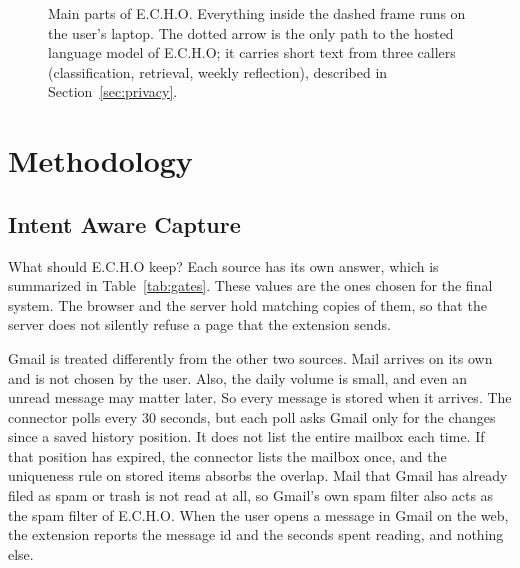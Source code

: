 \documentclass[conference]{IEEEtran}
\begin{document}
\begin{figure}[t]
\caption{Main parts of E.C.H.O. Everything inside the dashed frame runs on the user's laptop. The dotted arrow is the only path to the hosted language model of E.C.H.O; it carries short text from three callers (classification, retrieval, weekly reflection), described in Section~\ref{sec:privacy}.}
\label{fig:arch}
\end{figure}

\section{Methodology}\label{sec:method}
\subsection{Intent Aware Capture}
What should E.C.H.O keep? Each source has its own answer, which is summarized in Table~\ref{tab:gates}. These values are the ones chosen for the final system. The browser and the server hold matching copies of them, so that the server does not silently refuse a page that the extension sends.

Gmail is treated differently from the other two sources. Mail arrives on its own and is not chosen by the user. Also, the daily volume is small, and even an unread message may matter later. So every message is stored when it arrives. The connector polls every 30 seconds, but each poll asks Gmail only for the changes since a saved history position. It does not list the entire mailbox each time. If that position has expired, the connector lists the mailbox once, and the uniqueness rule on stored items absorbs the overlap. Mail that Gmail has already filed as spam or trash is not read at all, so Gmail's own spam filter also acts as the spam filter of E.C.H.O. When the user opens a message in Gmail on the web, the extension reports the message id and the seconds spent reading, and nothing else.
\end{document}
